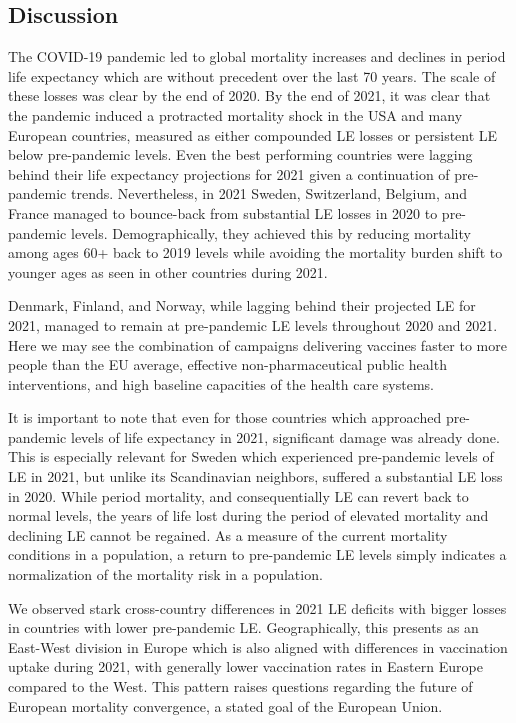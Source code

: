 \documentclass[12pt]{article}
\begin{document}
\subsection*{Discussion}

The COVID-19 pandemic led to global mortality increases and declines in period life expectancy which are without precedent over the last 70 years. The scale of these losses was clear by the end of 2020. By the end of 2021, it was clear that the pandemic induced a protracted mortality shock in the USA and many European countries, measured as either compounded LE losses or persistent LE below pre-pandemic levels. Even the best performing countries were lagging behind their life expectancy projections for 2021 given a continuation of pre-pandemic trends. Nevertheless, in 2021 Sweden, Switzerland, Belgium, and France managed to bounce-back from substantial LE losses in 2020 to pre-pandemic levels. Demographically, they achieved this by reducing mortality among ages 60+ back to 2019 levels while avoiding the mortality burden shift to younger ages as seen in other countries during 2021.

Denmark, Finland, and Norway, while lagging behind their projected LE for 2021, managed to remain at pre-pandemic LE levels throughout 2020 and 2021. Here we may see the combination of  campaigns delivering vaccines faster to more people than the EU average, effective non-pharmaceutical public health interventions, and high baseline capacities of the health care systems.

It is important to note that even for those countries which approached pre-pandemic levels of life expectancy in 2021, significant damage was already done. This is especially relevant for Sweden which experienced pre-pandemic levels of LE in 2021, but unlike its Scandinavian neighbors, suffered a substantial LE loss in 2020. While period mortality, and consequentially LE can revert back to normal levels, the years of life lost during the period of elevated mortality and declining LE cannot be regained. As a measure of the current mortality conditions in a population, a return to pre-pandemic LE levels simply indicates a normalization of the mortality risk in a population.

We observed stark cross-country differences in 2021 LE deficits with bigger losses in countries with lower pre-pandemic LE. Geographically, this presents as an East-West division in Europe which is also aligned with differences in vaccination uptake during 2021, with generally lower vaccination rates in Eastern Europe compared to the West. This pattern raises questions regarding the future of European mortality convergence, a stated goal of the European Union.\cite{EuropeanComission2009}
\end{document}

